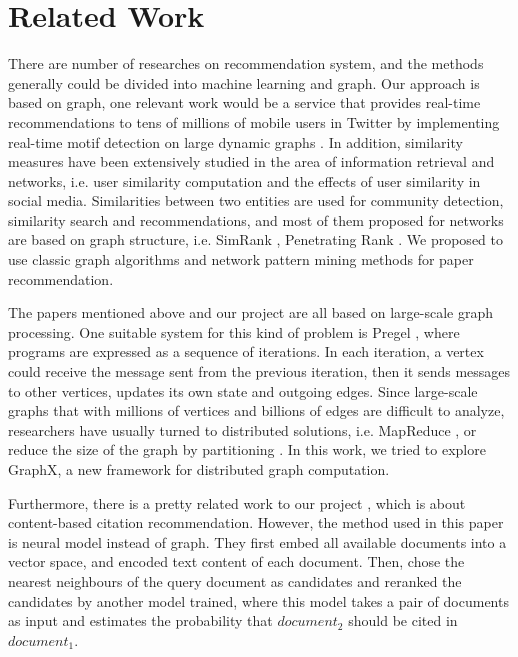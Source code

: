 \section{Related Work} \label{sec:related-work}

There are number of researches on recommendation system, and the methods generally could be divided into machine learning and graph. Our approach is based on graph, one relevant work would be a service that provides real-time recommendations to tens of millions of mobile users in Twitter by implementing real-time motif detection on large dynamic graphs \cite{Gupta:2014}. In addition, similarity measures \cite{Goel2013} have been extensively studied in the area of information retrieval and networks, i.e. user similarity computation and the effects of user similarity in social media. Similarities between two entities are used for community detection, similarity search and recommendations, and most of them proposed for networks are based on graph structure, i.e. SimRank \cite{Jeh:2002}, Penetrating Rank \cite{Zhao:2009}. We proposed to use classic graph algorithms and network pattern mining methods for paper recommendation.

The papers mentioned above and our project are all based on large-scale graph processing. One suitable system for this kind of problem is Pregel \cite{Malewicz:2010}, where programs are expressed as a sequence of iterations. In each iteration, a vertex could receive the message sent from the previous iteration, then it sends messages to other vertices, updates its own state and outgoing edges. Since large-scale graphs that with millions of vertices and billions of edges are difficult to analyze, researchers have usually turned to distributed solutions, i.e. MapReduce \cite{Lin:2010}, or reduce the size of the graph by partitioning \cite{Karypis:1998}. In this work, we tried to explore GraphX, a new framework for distributed graph computation.

Furthermore, there is a pretty related work to our project \cite{DBLP}, which is about content-based citation recommendation. However, the method used in this paper is neural model instead of graph. They first embed all available documents into a vector space, and encoded text content of each document. Then, chose the nearest neighbours of the query document as candidates and reranked the candidates by another model trained, where this model takes a pair of documents as input and estimates the probability that $document_2$ should be cited in $document_1$. 

